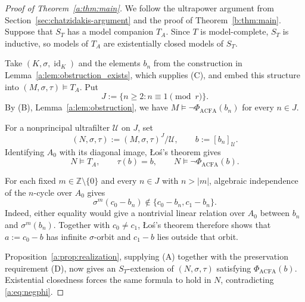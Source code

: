 \documentclass[10pt,a4paper]{amsart}
\renewcommand{\ge}{\geqslant}
\theoremstyle{definition}
\newcommand{\Z}{\mathbb Z}
\DeclareMathOperator{\id}{id}
\begin{document}
\begin{proof}[Proof of Theorem~\ref{a:thm:main}]
We follow the ultrapower argument from
Section~\ref{sec:chatzidakis-argument} and the proof of
Theorem~\ref{b:thm:main}.
Suppose that $S_T$ has a model companion $T_A$.
Since $T$ is model-complete, $S_T$ is inductive, so models
of $T_A$ are existentially closed models of $S_T$.

Take $(K,\sigma,\id_K)$ and the elements $b_n$ from the
construction in Lemma~\ref{a:lem:obstruction_exists},
which supplies (C), and embed this structure into
$(M,\sigma,\tau)\models T_A$.
Put
\[
J:=\{n\ge2:n\equiv1\pmod r\}.
\]
By (B), Lemma~\ref{a:lem:obstruction}, we have
$M\models\neg\Phi_{\mathrm{ACFA}}(b_n)$ for every $n\in J$.

For a nonprincipal ultrafilter $\mathcal U$ on $J$, set
\[
(N,\sigma,\tau):=(M,\sigma,\tau)^J/\mathcal U,
\qquad b:=[b_n]_{\mathcal U}.
\]
Identifying $A_0$ with its diagonal image, \L o\'s's theorem gives
\begin{equation}\label{a:eq:negphi}
N\models T_A,\qquad \tau(b)=b,\qquad
N\models\neg\Phi_{\mathrm{ACFA}}(b).
\end{equation}

For each fixed $m\in\Z\setminus\{0\}$ and every $n\in J$
with $n>|m|$, algebraic independence of the $n$-cycle
over $A_0$ gives
\[
\sigma^m(c_0-b_n)\notin\{c_0-b_n,c_1-b_n\}.
\]
Indeed, either equality would give a nontrivial linear
relation over $A_0$ between $b_n$ and $\sigma^m(b_n)$.
Together with $c_0\ne c_1$, \L o\'s's theorem therefore
shows that $a:=c_0-b$ has infinite $\sigma$-orbit and
$c_1-b$ lies outside that orbit.

Proposition~\ref{a:prop:realization}, supplying (A) together
with the preservation requirement (D), now gives an
$S_T$-extension of $(N,\sigma,\tau)$ satisfying
$\Phi_{\mathrm{ACFA}}(b)$.
Existential closedness forces the same formula to hold
in $N$, contradicting \eqref{a:eq:negphi}.
\end{proof}
\end{document}
